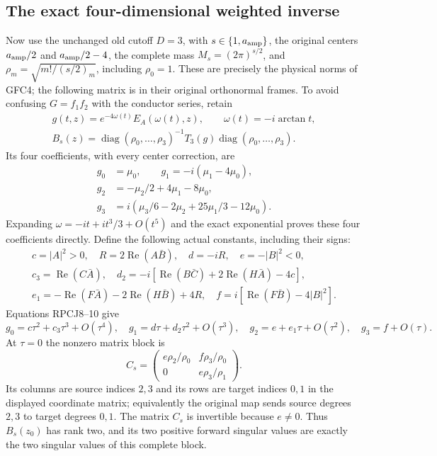 \documentclass[11pt]{article}
\begin{document}
\subsection{The exact four-dimensional weighted inverse}
Now use the unchanged old cutoff $D=3$, with $s\in\{1,a_{\rm amp}\}$,
the original centers $a_{\rm amp}/2$ and $a_{\rm amp}/2-4$,
the complete mass $M_s=(2\pi)^{s/2}$, and
$\rho_m=\sqrt{m!/(s/2)_m}$, including $\rho_0=1$.
These are precisely the physical norms of GFC4; the following matrix
is in their original orthonormal frames.
To avoid confusing $G=f_1f_2$ with the conductor series, retain
\[
 \begin{gathered}
 g(t,z)=e^{-4\omega(t)}E_A(\omega(t),z),\qquad
 \omega(t)=-i\arctan t,\\
 B_s(z)=\operatorname{diag}(\rho_0,\ldots,\rho_3)^{-1}
           T_3(g)\operatorname{diag}(\rho_0,\ldots,\rho_3).
 \end{gathered}
 \tag{RPCJ9}
\]
Its four coefficients, with every center correction, are
\[
 \begin{split}
 g_0&=\mu_0,\qquad g_1=-i(\mu_1-4\mu_0),\\
 g_2&=-\mu_2/2+4\mu_1-8\mu_0,\\
 g_3&=i(\mu_3/6-2\mu_2+25\mu_1/3-12\mu_0).
 \end{split}\tag{RPCJ10}
\]
Expanding $\omega=-it+it^3/3+O(t^5)$ and the exact exponential
proves these four coefficients directly.
Define the following actual constants, including their signs:
\[
 \begin{gathered}
 c=|A|^2>0,\quad R=2\operatorname{Re}(A\bar B),\quad
 d=-iR,\quad e=-|B|^2<0,\\
 c_3=\operatorname{Re}(C\bar A),\quad
 d_2=-i[\operatorname{Re}(B\bar C)+2\operatorname{Re}(H\bar A)-4c],\\
 e_1=-\operatorname{Re}(F\bar A)-2\operatorname{Re}(H\bar B)+4R,
 \quad f=i[\operatorname{Re}(F\bar B)-4|B|^2].
 \end{gathered}\tag{RPCJ11}
\]
Equations RPCJ8--10 give
\[
 g_0=c\tau^2+c_3\tau^3+O(\tau^4),\quad
 g_1=d\tau+d_2\tau^2+O(\tau^3),\quad
 g_2=e+e_1\tau+O(\tau^2),\quad g_3=f+O(\tau).
 \tag{RPCJ12}
\]
At $\tau=0$ the nonzero matrix block is
\[
 C_s=\begin{pmatrix}
 e\rho_2/\rho_0&f\rho_3/\rho_0\\
 0&e\rho_3/\rho_1
 \end{pmatrix}.
 \tag{RPCJ13}
\]
Its columns are source indices $2,3$ and its rows are target indices
$0,1$ in the displayed coordinate matrix; equivalently the original
map sends source degrees $2,3$ to target degrees $0,1$.
The matrix $C_s$ is invertible because $e\ne0$.
Thus $B_s(z_0)$ has rank two, and its two positive forward singular
values are exactly the two singular values of this complete block.
\end{document}
